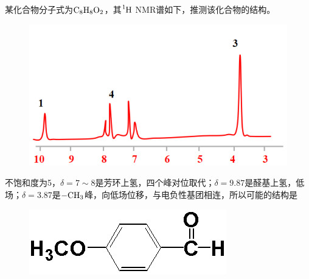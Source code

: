 \begin{example}
	某化合物分子式为$\ce{C8H8O2}$，其$\ce{^{1}H}$ NMR谱如下，推测该化合物的结构。
	
	\begin{figure}[!h]
		\centering
		\includegraphics[width=0.7\linewidth]{image/chp6_example2}
		\label{fig:chp6example2}
	\end{figure}
	
	\solve	
	不饱和度为5，$\delta=7\sim 8$是芳环上氢，四个峰对位取代；$\delta=9.87$是醛基上氢，低场；$\delta=3.87$是$\ce{-CH3}$峰，向低场位移，与电负性基团相连，所以可能的结构是
	
	\begin{figure}[!h]
		\centering
		\includegraphics[width=0.5\linewidth]{image/chp6_answer2}
		\label{fig:chp6answer2}
	\end{figure}
\end{example}
